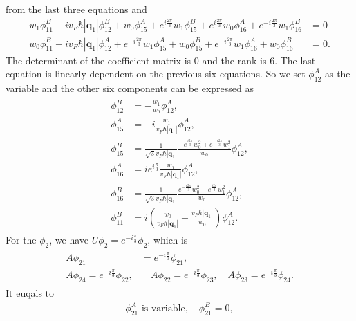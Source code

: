 \documentclass[10pt, oneside]{article}
\newcommand{\p}[1]{\left(#1\right)}
\newcommand{\bv}[1]{\left|#1\right|}
\begin{document}
from the last three equations and 
\begin{align}
	w_1 \phi_{11}^{B} - i v_F \hbar \left|\bm{q}_1\right| \phi_{12}^{B} + w_0 \phi_{15}^{A} + e^{i \frac{2 \pi}{3}} w_1 \phi_{15}^{B} + e^{i \frac{2 \pi}{3}} w_0 \phi_{16}^{A} + e^{ -i \frac{2 \pi}{3}} w_1 \phi_{16}^{B} &= 0 \\
	w_0 \phi_{11}^{B} + i v_F \hbar \left|\bm{q}_1\right| \phi_{12}^{A} + e^{ -i \frac{2 \pi}{3}} w_1 \phi_{15}^{A} + w_0 \phi_{15}^{B} + e^{ -i \frac{2 \pi}{3}} w_1 \phi_{16}^{A} + w_0 \phi_{16}^{B} &= 0 .
\end{align}
The determinant of the coefficient matrix is 0 and the rank is 6. The last equation is linearly dependent on the previous six equations. So we set \(\phi_{12}^{A}\) as the variable and the other six components can be expressed as 
\begin{align}
	\begin{split}
		\phi_{12}^{B} &= - \frac{w_1}{w_0} \phi_{12}^{A}, \\
		\phi_{15}^{A} &= - i \frac{ w_1}{ v_F \hbar \bv{\bm{q}_1}} \phi_{12}^{A}, \\
		\phi_{15}^{B} & = \frac{1}{\sqrt{3} v_F \hbar \bv{\bm{q}_1}} \frac{ - e^{\frac{i 2 \pi}{3}} w_{0}^{2}+ e^{-\frac{i 2\pi}{3}} w_{1}^{2}}{w_0} \phi_{12}^{A}, \\
		\phi_{16}^{A} & =  i e^{i \frac{ \pi}{3}} \frac{w_{1}}{v_F \hbar \bv{\bm{q}_1}} \phi_{12}^{A}, \\
		\phi_{16}^{B} & = \frac{1}{\sqrt{3} v_F \hbar \bv{\bm{q}_1}} \frac{ e^{-\frac{i 2 \pi}{3}} w_{0}^{2} - e^{\frac{i 2\pi}{3}} w_{1}^{2}}{w_0} \phi_{12}^{A}, \\
		\phi_{11}^{B} & = i \p{\frac{w_0}{v_F \hbar \bv{\bm{q}_1}} - \frac{v_F \hbar \bv{\bm{q}_1}}{w_0}} \phi_{12}^{A}.
	\end{split}
\end{align} 
For the \(\phi_2\), we have \(U \phi_2 = e^{- i \frac{\pi}{3}} \phi_2\), which is 
\begin{align}
	\begin{split}
		A \phi_{21} &= e^{- i \frac{\pi}{3}} \phi_{21}, \\
		A \phi_{24} = e^{- i \frac{\pi}{3}} \phi_{22},&\quad A \phi_{22} = e^{- i \frac{\pi}{3}} \phi_{23}, \quad A \phi_{23} = e^{- i \frac{\pi}{3}} \phi_{24}.
	\end{split}
\end{align}
It euqals to 
\begin{align}
	\phi_{21}^{A} \,\, \text{is variable}, \quad \phi_{21}^{B} = 0,
\end{align}
\end{document}
